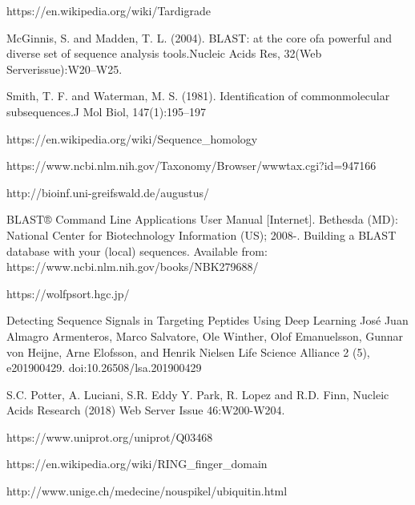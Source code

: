 \documentclass{article}
\begin{document}
 
\newpage 
\begin{thebibliography}{9}
	
	https://en.wikipedia.org/wiki/Tardigrade
	
	  McGinnis, S. and Madden, T. L. (2004). BLAST: at the core ofa powerful and diverse set of sequence analysis tools.Nucleic Acids Res, 32(Web Serverissue):W20--W25.
	
	Smith, T. F. and Waterman, M. S. (1981). Identification of commonmolecular subsequences.J Mol Biol, 147(1):195--197
	
	
	https://en.wikipedia.org/wiki/Sequence\_homology
	
	
 https://www.ncbi.nlm.nih.gov/Taxonomy/Browser/wwwtax.cgi?id=947166

http://bioinf.uni-greifswald.de/augustus/


 BLAST® Command Line Applications User Manual [Internet]. Bethesda (MD): National Center for Biotechnology Information (US); 2008-. Building a BLAST database with your (local) sequences. Available from: https://www.ncbi.nlm.nih.gov/books/NBK279688/
 
 https://wolfpsort.hgc.jp/
 
  Detecting Sequence Signals in Targeting Peptides Using Deep Learning
 José Juan Almagro Armenteros, Marco Salvatore, Ole Winther, Olof Emanuelsson, Gunnar von Heijne, Arne Elofsson, and Henrik Nielsen
 Life Science Alliance 2 (5), e201900429. doi:10.26508/lsa.201900429 
 
 S.C. Potter, A. Luciani, S.R. Eddy Y. Park, R. Lopez and R.D. Finn,
 Nucleic Acids Research (2018) Web Server Issue 46:W200-W204. 
 
  https://www.uniprot.org/uniprot/Q03468
  
   
 https://en.wikipedia.org/wiki/RING_finger_domain
 
  
 http://www.unige.ch/medecine/nouspikel/ubiquitin.html
 
 
\end{thebibliography}
\end{document}
